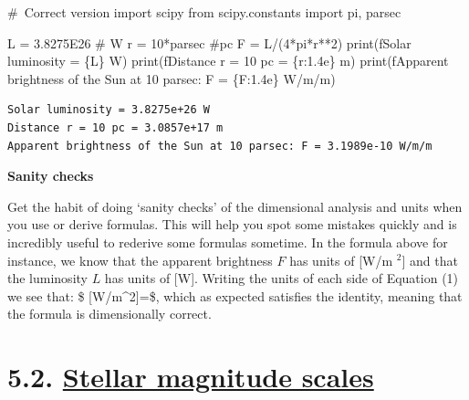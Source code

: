\documentclass[
  letterpaper,
  DIV=11,
  numbers=noendperiod]{scrreprt}
\newenvironment{Shaded}{\begin{snugshade}}{\end{snugshade}}
\newcommand{\BuiltInTok}[1]{\textcolor[rgb]{0.00,0.23,0.31}{#1}}
\newcommand{\CommentTok}[1]{\textcolor[rgb]{0.37,0.37,0.37}{#1}}
\newcommand{\DecValTok}[1]{\textcolor[rgb]{0.68,0.00,0.00}{#1}}
\newcommand{\FloatTok}[1]{\textcolor[rgb]{0.68,0.00,0.00}{#1}}
\newcommand{\ImportTok}[1]{\textcolor[rgb]{0.00,0.46,0.62}{#1}}
\newcommand{\NormalTok}[1]{\textcolor[rgb]{0.00,0.23,0.31}{#1}}
\newcommand{\OperatorTok}[1]{\textcolor[rgb]{0.37,0.37,0.37}{#1}}
\newcommand{\SpecialCharTok}[1]{\textcolor[rgb]{0.37,0.37,0.37}{#1}}
\newcommand{\SpecialStringTok}[1]{\textcolor[rgb]{0.13,0.47,0.30}{#1}}
\begin{document}
\begin{Shaded}
\begin{Highlighting}[]
\CommentTok{\# Correct version}
\ImportTok{import}\NormalTok{ scipy}
\ImportTok{from}\NormalTok{ scipy.constants }\ImportTok{import}\NormalTok{ pi, parsec}

\NormalTok{L }\OperatorTok{=} \FloatTok{3.8275E26} \CommentTok{\# W}
\NormalTok{r }\OperatorTok{=} \DecValTok{10}\OperatorTok{*}\NormalTok{parsec }\CommentTok{\#pc}
\NormalTok{F }\OperatorTok{=}\NormalTok{ L}\OperatorTok{/}\NormalTok{(}\DecValTok{4}\OperatorTok{*}\NormalTok{pi}\OperatorTok{*}\NormalTok{r}\OperatorTok{**}\DecValTok{2}\NormalTok{)}
\BuiltInTok{print}\NormalTok{(}\SpecialStringTok{f\textquotesingle{}Solar luminosity = }\SpecialCharTok{\{}\NormalTok{L}\SpecialCharTok{\}}\SpecialStringTok{ W\textquotesingle{}}\NormalTok{)}
\BuiltInTok{print}\NormalTok{(}\SpecialStringTok{f\textquotesingle{}Distance r = 10 pc = }\SpecialCharTok{\{}\NormalTok{r}\SpecialCharTok{:1.4e\}}\SpecialStringTok{ m\textquotesingle{}}\NormalTok{)}
\BuiltInTok{print}\NormalTok{(}\SpecialStringTok{f\textquotesingle{}Apparent brightness of the Sun at 10 parsec: F = }\SpecialCharTok{\{}\NormalTok{F}\SpecialCharTok{:1.4e\}}\SpecialStringTok{ W/m/m\textquotesingle{}}\NormalTok{)}
\end{Highlighting}
\end{Shaded}

\begin{verbatim}
Solar luminosity = 3.8275e+26 W
Distance r = 10 pc = 3.0857e+17 m
Apparent brightness of the Sun at 10 parsec: F = 3.1989e-10 W/m/m
\end{verbatim}

\textbf{Sanity checks}

Get the habit of doing `sanity checks' of the dimensional analysis and
units when you use or derive formulas. This will help you spot some
mistakes quickly and is incredibly useful to rederive some formulas
sometime. In the formula above for instance, we know that the apparent
brightness \(F\) has units of {[}W/m \(^2\){]} and that the luminosity
\(L\) has units of {[}W{]}. Writing the units of each side of Equation
(1) we see that: \$ {[}W/m\^{}2{]}=\dfrac{[W]}{[m^2]}\$, which as
expected satisfies the identity, meaning that the formula is
dimensionally correct.

\hypertarget{stellar-magnitude-scales}{%
\section{\texorpdfstring{5.2. \protect\hyperlink{toc0_}{Stellar
magnitude
scales}}{5.2. Stellar magnitude scales}}\label{stellar-magnitude-scales}}
\end{document}

